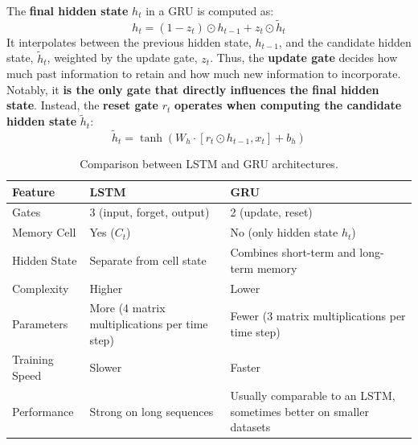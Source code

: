 \highspace
The \textbf{final hidden state} $h_t$ in a GRU is computed as:
\begin{equation}
    h_t = \left(1 - z_t\right) \odot h_{t-1} + z_t \odot \tilde{h}_t
\end{equation}
It interpolates between the previous hidden state, $h_{t-1}$, and the candidate hidden state, $\tilde{h}_t$, weighted by the update gate, $z_t$. Thus, the \textbf{update gate} decides how much past information to retain and how much new information to incorporate. Notably, it \textbf{is the only gate that directly influences the final hidden state}. Instead, the \textbf{reset gate} $r_t$ \textbf{operates when computing the candidate hidden state} $\tilde{h}_t$:
\begin{equation}
    \tilde{h}_t = \tanh(W_h \cdot [r_t \odot h_{t-1}, x_t] + b_h)
\end{equation}

\begin{table}[!htp]
    \centering
    \begin{tabular}{@{} l p{11em} p{11em} @{}}
        \toprule
        \textbf{Feature} & \textbf{LSTM} & \textbf{GRU} \\
        \midrule
        Gates & 3 (input, forget, output) & 2 (update, reset) \\[.5em]
        Memory Cell & Yes ($C_t$) & No (only hidden state $h_t$) \\[.5em]
        Hidden State & Separate from cell state & Combines short-term and long-term memory \\[.5em]
        Complexity & Higher & Lower \\[.5em]
        Parameters & More (4 matrix multiplications per time step) & Fewer (3 matrix multiplications per time step) \\[.5em]
        Training Speed & Slower & Faster \\[.5em]
        Performance & Strong on long sequences & Usually comparable to an LSTM, sometimes better on smaller datasets \\
        \bottomrule
    \end{tabular}
    \caption{Comparison between LSTM and GRU architectures.}
\end{table}

\newpage

